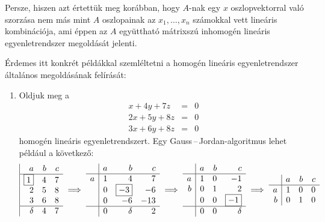 \documentclass[a4paper, showtrims]{memoir}
\theoremstyle{plain}
\theoremstyle{remark}
\theoremstyle{definition}
\begin{document}
Persze, hiszen azt értettük meg korábban, hogy $A$-nak egy $x$ oszlopvektorral való szorzása
nem más mint $A$ oszlopainak az $x_1,\ldots,x_n$ számokkal vett lineáris kombinációja,
ami éppen az $A$ együttható mátrixszú inhomogén lineáris egyenletrendszer megoldását jelenti.

Érdemes itt konkrét példákkal szemléltetni a homogén lineáris egyenletrendszer általános megoldásának felírását:
\begin{enumerate}
	\item
    Oldjuk meg a
    \begin{eqnarray*}
      x+4y+7z&=& 0\\
	  2x+5y+8z&=& 0\\
	  3x+6y+8z&=& 0
    \end{eqnarray*}
    homogén  lineáris egyenletrendszert.
    Egy Gauss\,--\,Jordan-algoritmus  lehet például a következő:
     \[
     \begin{array}{|rrr}
     a         & b & c \\
      \hline
      \boxed{1} & 4 & 7 \\
      2         & 5 & 8 \\
      3         & 6 & 8 \\
      \hline
      \delta    & 4 & 7
      \end{array}
      \implies
      \begin{array}{r|rrr}
        & a & b          & c   \\
      \hline
      a & 1 & 4          & 7   \\
        & 0 & \boxed{-3} & -6  \\
        & 0 & -6         & -13 \\
      \hline
        & 0 & \delta     & 2
      \end{array}
      \implies
      \begin{array}{r|rrr}
        & a & b & c          \\
      \hline
      a & 1 & 0 & -1         \\
      b & 0 & 1 & 2          \\
        & 0 & 0 & \boxed{-1} \\
      \hline
        & 0 & 0 & \delta
      \end{array}
      \implies
      \begin{array}{r|rrr}
        & a & b & c \\
      \hline
      a & 1 & 0 & 0 \\
      b & 0 & 1 & 0 \\

\end{array}\]
\end{enumerate}
\end{document}
